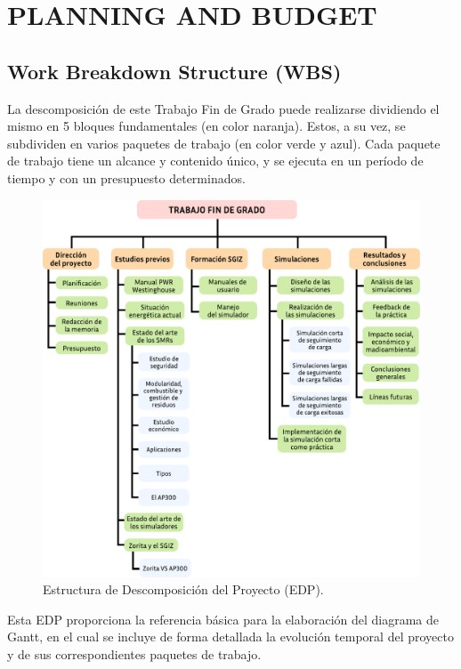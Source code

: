 \newpage
\section{PLANNING AND BUDGET} \label{planning_budget}

\subsection{Work Breakdown Structure (WBS)}

La descomposición de este Trabajo Fin de Grado puede realizarse dividiendo el mismo en 5 bloques fundamentales (en color naranja). Estos, a su vez, se subdividen en varios paquetes de trabajo (en color verde y azul). Cada paquete de trabajo tiene un alcance y contenido único, y se ejecuta en un período de tiempo y con un presupuesto determinados.

\begin{figure}[h]
    \centering
    \includegraphics[width=\textwidth]{content/figures/edp_tfg.pdf}
    \caption{Estructura de Descomposición del Proyecto (EDP).}
    \label{fig:edp_tfg}
  \end{figure}

  Esta EDP proporciona la referencia básica para la elaboración del diagrama de Gantt, en el cual se incluye de forma detallada la evolución temporal del proyecto y de sus correspondientes paquetes de trabajo.

